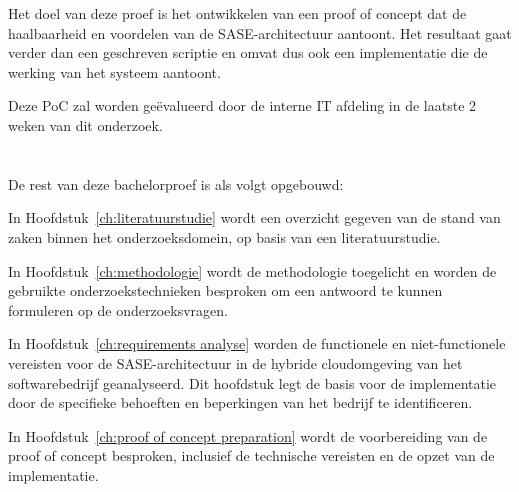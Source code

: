 Het doel van deze proef is het ontwikkelen van een proof of concept dat de haalbaarheid en voordelen van de SASE-architectuur aantoont. Het resultaat gaat verder dan een geschreven scriptie en omvat dus ook een implementatie die de werking van het systeem aantoont.

\vspace{2ex}

Deze PoC zal worden geëvalueerd door de interne IT afdeling in de laatste 2 weken van dit onderzoek.

\section{}%
\label{sec:opzet-bachelorproef}


De rest van deze bachelorproef is als volgt opgebouwd:

\vspace{2ex}

In Hoofdstuk~\ref{ch:literatuurstudie} wordt een overzicht gegeven van de stand van zaken binnen het onderzoeksdomein, op basis van een literatuurstudie.

\vspace{2ex}

In Hoofdstuk~\ref{ch:methodologie} wordt de methodologie toegelicht en worden de gebruikte onderzoekstechnieken besproken om een antwoord te kunnen formuleren op de onderzoeksvragen.

\vspace{2ex}

In Hoofdstuk~\ref{ch:requirements analyse} worden de functionele en niet-functionele vereisten voor de SASE-architectuur in de hybride cloudomgeving van het softwarebedrijf geanalyseerd. Dit hoofdstuk legt de basis voor de implementatie door de specifieke behoeften en beperkingen van het bedrijf te identificeren.

\vspace{2ex}

In Hoofdstuk~\ref{ch:proof of concept preparation} wordt de voorbereiding van de proof of concept besproken, inclusief de technische vereisten en de opzet van de implementatie.

\vspace{2ex}

